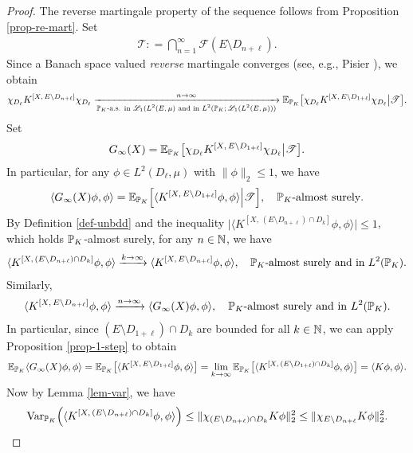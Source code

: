 \documentclass[12pt]{paper}
\numberwithin{theorem}{section}
\numberwithin{figure}{section}
\numberwithin{equation}{section}
\begin{document}
\begin{proof}
The reverse martingale property of the sequence follows from Proposition \ref{prop-re-mart}.
Set
\begin{align}\label{tail-sigma}
\mathscr{T} : =  \bigcap_{n=1}^\infty \mathcal{F}(E\setminus D_{n+\ell}).
\end{align}
Since a Banach space valued {\it reverse} martingale converges (see, e.g., Pisier \cite[p. 34]{pisier-B-martingale}), we obtain
\[
\chi_{D_\ell}K^{[X, \,  E \setminus D_{n+\ell}]} \chi_{D_\ell} \xrightarrow[\text{$\mathbb{P}_K$-a.s. in $\mathscr{L}_1(L^2(E, \mu)$ and in $L^2(\mathbb{P}_K; \mathscr{L}_1(L^2(E, \mu)))$}]{n\to\infty}   \mathbb{E}_{\mathbb{P}_K}\big[\chi_{D_\ell}K^{[X, \,  E \setminus D_{1+\ell}]} \chi_{D_\ell}  \big|   \mathscr{T}\big].
\]
Set
$$
G_\infty(X)=
\mathbb{E}_{\mathbb{P}_K}\big[\chi_{D_\ell}K^{[X, \,  E \setminus D_{1+\ell}]} \chi_{D_\ell}  \big|   \mathscr{T}\big].
$$
In particular, for any  $\phi \in L^2(D_\ell, \mu)$ with $\|\phi \|_2 \le 1$, we have
 \[
 \langle G_\infty(X)\phi, \phi \rangle  =  \mathbb{E}_{\mathbb{P}_K} \Big[ \langle  K^{[X, \, E\setminus D_{1+\ell} ]} \phi, \phi\rangle  \Big| \mathscr{T} \Big], \quad \text{$\mathbb{P}_K$-almost surely}.
  \]
 By Definition \ref{def-unbdd} and the inequality $\big| \langle  K^{[X, \, (E\setminus D_{n+\ell} ) \cap D_k]} \phi, \phi\rangle\big| \le 1$, which holds $\mathbb{P}_K$-almost surely,
 for any $n\in\mathbb{N}$, we have
 \begin{align}\label{finite-inf}
\langle  K^{[X, \, (E\setminus D_{n+\ell} ) \cap D_k]} \phi, \phi\rangle  \xrightarrow{k\to\infty} \langle  K^{[X, \, E\setminus D_{n+\ell} ]} \phi, \phi\rangle, \quad \text{$\mathbb{P}_K$-almost surely and in $L^2(\mathbb{P}_K)$.}
 \end{align}
 Similarly,
  \begin{align}\label{inf-final}
 \langle  K^{[X, \, E\setminus D_{n+\ell} ]} \phi, \phi\rangle \xrightarrow{n\to\infty}  \langle G_\infty(X)\phi, \phi \rangle, \quad \text{$\mathbb{P}_K$-almost surely and in $L^2(\mathbb{P}_K)$.}
 \end{align}
In particular, since $(E\setminus D_{1+\ell} ) \cap D_k$ are bounded for all $k\in\mathbb{N}$, we can apply Proposition  \ref{prop-1-step} to obtain
\[
\mathbb{E}_{\mathbb{P}_K}  \langle G_\infty(X)\phi, \phi \rangle  =   \mathbb{E}_{\mathbb{P}_K} \big[ \langle  K^{[X, \, E\setminus D_{1+\ell} ]} \phi, \phi\rangle  \big] =\lim_{k \to\infty}  \mathbb{E}_{\mathbb{P}_K} \big[ \langle  K^{[X, \, (E\setminus D_{1+\ell} ) \cap D_k]} \phi, \phi\rangle \big]  = \langle K \phi, \phi\rangle.
\]
Now by Lemma \ref{lem-var}, we have
\[
\mathrm{Var}_{\mathbb{P}_K}\Big(\langle  K^{[X, \, (E\setminus D_{n+\ell} ) \cap D_k]} \phi, \phi\rangle \Big) \le  \|\chi_{(E\setminus D_{n+\ell} ) \cap D_k} K \phi\|_2^2 \le \|\chi_{E\setminus D_{n+\ell} } K \phi\|_2^2.
\]
\end{proof}
\end{document}
